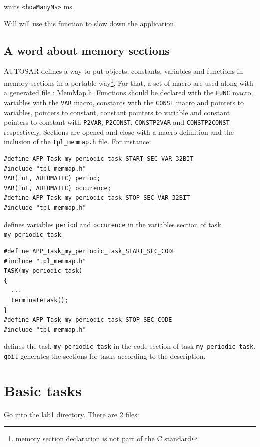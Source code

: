 \documentclass[11pt]{article}
\newcommand{\unixcl}[1]{\texttt{\fcolorbox{black}{gray!20}{#1}}}
\begin{document}
\unixcl{void delay(<howManyMs>);} waits \lstinline{<howManyMs>} ms. 

Will will use this function to slow down the application.

\subsection{A word about memory sections}

AUTOSAR defines a way to put objects: constants, variables and functions in memory sections in a portable way\footnote{memory section declaration is not part of the C standard}. For that, a set of macro are used along with a generated file : MemMap.h. Functions should be declared with the \lstinline{FUNC} macro, variables with the \lstinline{VAR} macro, constants with the \lstinline{CONST} macro and pointers to variables, pointers to constant, constant pointers to variable and constant pointers to constant with \lstinline{P2VAR}, \lstinline{P2CONST}, \lstinline{CONSTP2VAR} and \lstinline{CONSTP2CONST} respectively. Sections are opened and close with a macro definition and the inclusion of the \lstinline{tpl_memmap.h} file. For instance:

\begin{lstlisting}
#define APP_Task_my_periodic_task_START_SEC_VAR_32BIT
#include "tpl_memmap.h"
VAR(int, AUTOMATIC) period;
VAR(int, AUTOMATIC) occurence;
#define APP_Task_my_periodic_task_STOP_SEC_VAR_32BIT
#include "tpl_memmap.h"
\end{lstlisting}

defines variables \lstinline{period} and \lstinline{occurence} in the variables section of task \lstinline{my_periodic_task}.

\begin{lstlisting}
#define APP_Task_my_periodic_task_START_SEC_CODE
#include "tpl_memmap.h"
TASK(my_periodic_task)
{
  ...
  TerminateTask();
}
#define APP_Task_my_periodic_task_STOP_SEC_CODE
#include "tpl_memmap.h"
\end{lstlisting}

defines the task \lstinline{my_periodic_task} in the code section of task \lstinline{my_periodic_task}. \lstinline{goil} generates the sections for tasks according to the description.

\section{Basic tasks}

Go into the lab1 directory. There are 2 files:
\end{document}
